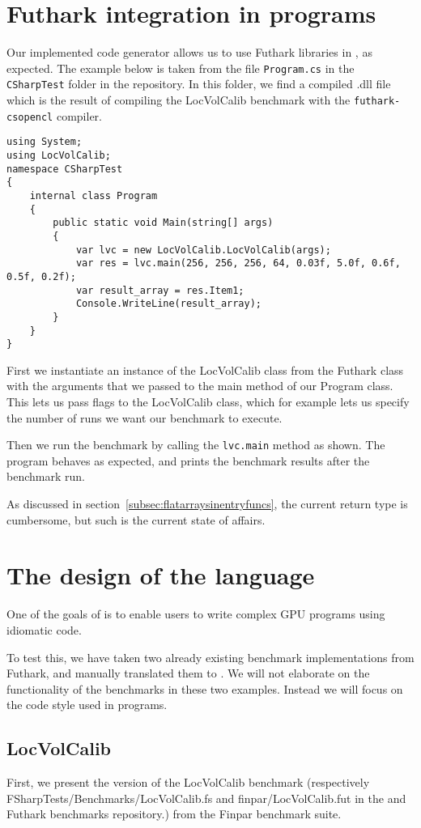 \section{Futhark \csharp{} integration in \csharp{} programs}
Our implemented code generator allows us to use Futhark libraries in \csharp{},
as expected. The example below is taken from the file \texttt{Program.cs} in the
\texttt{CSharpTest} folder in the \fshark{} repository.
In this folder, we find a compiled \csharp{} .dll file which is the result of
compiling the LocVolCalib benchmark with the \texttt{futhark-csopencl} compiler.
\begin{verbatim}
using System;
using LocVolCalib;
namespace CSharpTest
{
    internal class Program
    {
        public static void Main(string[] args)
        {
            var lvc = new LocVolCalib.LocVolCalib(args);
            var res = lvc.main(256, 256, 256, 64, 0.03f, 5.0f, 0.6f, 0.5f, 0.2f);
            var result_array = res.Item1;
            Console.WriteLine(result_array);
        }
    }
}
\end{verbatim}
First we instantiate an instance of the LocVolCalib class from the Futhark
\csharp{} class with the arguments that we passed to the main method of our
Program class. This lets us pass flags to the LocVolCalib class, which for
example lets us specify the number of runs we want our benchmark to execute.

Then we run the benchmark by calling the \texttt{lvc.main} method as shown.
The program behaves as expected, and prints the benchmark results after the
benchmark run.

As discussed in section~\ref{subsec:flatarraysinentryfuncs}, the current return
type is cumbersome, but such is the current state of affairs.

\section{The design of the \fshark{} language}
\label{sec:fsharklanguageeval}
One of the goals of \fshark{} is to enable users to write complex GPU programs
using idiomatic \fsharp{} code.

To test this, we have taken two already existing benchmark implementations from
Futhark, and manually translated them to \fshark{}.
We will not elaborate on the functionality of the benchmarks in these two
examples. Instead we will focus on the code style used in \fshark{} programs.

\subsection{LocVolCalib}
\label{subsec:locvolcalib}
First, we present the \fshark{} version of the LocVolCalib benchmark (respectively
FSharpTests/Benchmarks/LocVolCalib.fs and finpar/LocVolCalib.fut in the
\fshark{} and Futhark benchmarks repository.) from the Finpar\cite{finpar}
benchmark suite.

